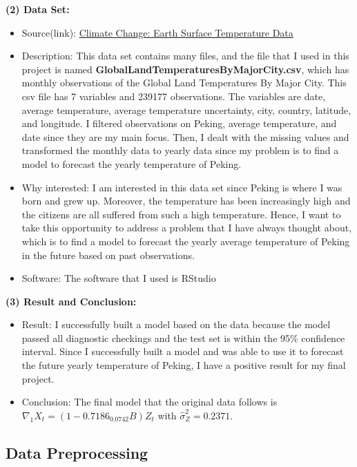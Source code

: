 \documentclass[
]{article}
\begin{document}
\textbf{(2) Data Set:}

\begin{itemize}
\item
  Source(link):
  \href{https://www.kaggle.com/datasets/berkeleyearth/climate-change-earth-surface-temperature-data}{Climate
  Change: Earth Surface Temperature Data}
\item
  Description: This data set contains many files, and the file that I
  used in this project is named
  \textbf{GlobalLandTemperaturesByMajorCity.csv}, which has monthly
  observations of the Global Land Temperatures By Major City. This csv
  file has 7 variables and 239177 observations. The variables are date,
  average temperature, average temperature uncertainty, city, country,
  latitude, and longitude. I filtered observations on Peking, average
  temperature, and date since they are my main focus. Then, I dealt with
  the missing values and transformed the monthly data to yearly data
  since my problem is to find a model to forecast the yearly temperature
  of Peking.
\item
  Why interested: I am interested in this data set since Peking is where
  I was born and grew up. Moreover, the temperature has been
  increasingly high and the citizens are all suffered from such a high
  temperature. Hence, I want to take this opportunity to address a
  problem that I have always thought about, which is to find a model to
  forecast the yearly average temperature of Peking in the future based
  on past observations.
\item
  Software: The software that I used is RStudio
\end{itemize}

\textbf{(3) Result and Conclusion:}

\begin{itemize}
\item
  Result: I successfully built a model based on the data because the
  model passed all diagnostic checkings and the test set is within the
  95\% confidence interval. Since I successfully built a model and was
  able to use it to forecast the future yearly temperature of Peking, I
  have a positive result for my final project.
\item
  Conclusion: The final model that the original data follows is
  \(\nabla_1X_t = (1-0.7186_{0.0742}B)Z_t\) with
  \(\hat{\sigma}^2_Z = 0.2371\).
\end{itemize}

\hypertarget{data-preprocessing}{%
\subsection{Data Preprocessing}\label{data-preprocessing}}
\end{document}
